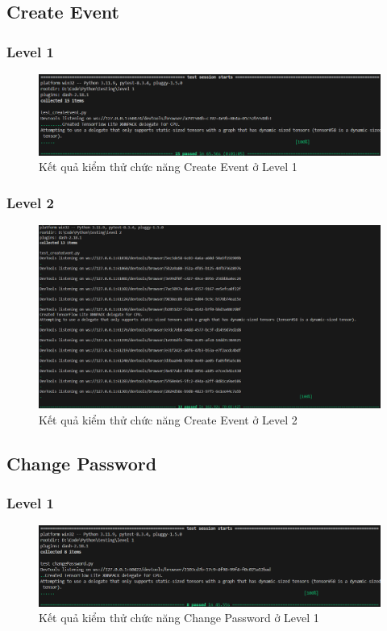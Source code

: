 \subsection{Create Event}
\subsubsection{Level 1}
\begin{figure}[H]
    \centering
    \includegraphics[width=0.8\linewidth]{image/results-create-event-lv1.png}
    \caption{Kết quả kiểm thử chức năng Create Event ở Level 1}
    \label{fig:enter-label}
\end{figure}
\subsubsection{Level 2}
\begin{figure}[H]
    \centering
    \includegraphics[width=0.8\linewidth]{image/results-create-event-lv2.png}
    \caption{Kết quả kiểm thử chức năng Create Event ở Level 2}
    \label{fig:enter-label}
\end{figure}
\subsection{Change Password}
\subsubsection{Level 1}
\begin{figure}[H]
    \centering
    \includegraphics[width=0.8\linewidth]{image/results-change-password-lv1.png}
    \caption{Kết quả kiểm thử chức năng Change Password ở Level 1}
    \label{fig:enter-label}
\end{figure}
